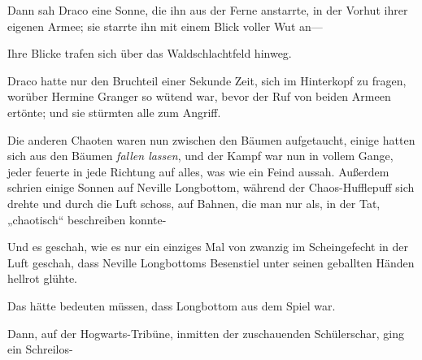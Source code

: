 Dann sah Draco eine Sonne, die ihn aus der Ferne anstarrte, in der Vorhut ihrer eigenen Armee; sie starrte ihn mit einem Blick voller Wut an—

Ihre Blicke trafen sich über das Waldschlachtfeld hinweg.

Draco hatte nur den Bruchteil einer Sekunde Zeit, sich im Hinterkopf zu fragen, worüber Hermine Granger so wütend war, bevor der Ruf von beiden Armeen ertönte; und sie stürmten alle zum Angriff.

\later

Die anderen Chaoten waren nun zwischen den Bäumen aufgetaucht, einige hatten sich aus den Bäumen \emph{fallen lassen}, und der Kampf war nun in vollem Gange, jeder feuerte in jede Richtung auf alles, was wie ein Feind aussah. Außerdem schrien einige Sonnen  auf Neville Longbottom, während der Chaos-Hufflepuff sich drehte und durch die Luft schoss, auf Bahnen, die man nur als, in der Tat, „chaotisch“ beschreiben konnte-

Und es geschah, wie es nur ein einziges Mal von zwanzig im Scheingefecht in der Luft geschah, dass Neville Longbottoms Besenstiel unter seinen geballten Händen hellrot glühte.

Das hätte bedeuten müssen, dass Longbottom aus dem Spiel war.

Dann, auf der Hogwarts-Tribüne, inmitten der zuschauenden Schülerschar, ging ein Schreilos-

